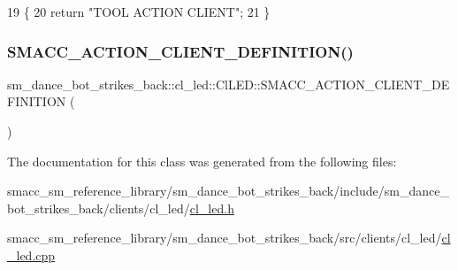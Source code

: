 \begin{DoxyCode}
19 \{
20     \textcolor{keywordflow}{return} \textcolor{stringliteral}{"TOOL ACTION CLIENT"};
21 \}
\end{DoxyCode}
\mbox{\label{classsm__dance__bot__strikes__back_1_1cl__led_1_1ClLED_afe42a517e8b1b8e85f071f0fda0fb4d7}} 
\subsubsection{\texorpdfstring{S\+M\+A\+C\+C\+\_\+\+A\+C\+T\+I\+O\+N\+\_\+\+C\+L\+I\+E\+N\+T\+\_\+\+D\+E\+F\+I\+N\+I\+T\+I\+O\+N()}{SMACC\_ACTION\_CLIENT\_DEFINITION()}}
{\footnotesize\ttfamily sm\+\_\+dance\+\_\+bot\+\_\+strikes\+\_\+back\+::cl\+\_\+led\+::\+Cl\+L\+E\+D\+::\+S\+M\+A\+C\+C\+\_\+\+A\+C\+T\+I\+O\+N\+\_\+\+C\+L\+I\+E\+N\+T\+\_\+\+D\+E\+F\+I\+N\+I\+T\+I\+ON (\begin{DoxyParamCaption}\item[{sm\+\_\+dance\+\_\+bot\+\_\+strikes\+\_\+back\+::\+L\+E\+D\+Control\+Action}]{ }\end{DoxyParamCaption})}



The documentation for this class was generated from the following files\+:\begin{DoxyCompactItemize}
\item 
smacc\+\_\+sm\+\_\+reference\+\_\+library/sm\+\_\+dance\+\_\+bot\+\_\+strikes\+\_\+back/include/sm\+\_\+dance\+\_\+bot\+\_\+strikes\+\_\+back/clients/cl\+\_\+led/\hyperlink{sm__dance__bot__strikes__back_2include_2sm__dance__bot__strikes__back_2clients_2cl__led_2cl__led_8h}{cl\+\_\+led.\+h}\item 
smacc\+\_\+sm\+\_\+reference\+\_\+library/sm\+\_\+dance\+\_\+bot\+\_\+strikes\+\_\+back/src/clients/cl\+\_\+led/\hyperlink{sm__dance__bot__strikes__back_2src_2clients_2cl__led_2cl__led_8cpp}{cl\+\_\+led.\+cpp}\end{DoxyCompactItemize}

